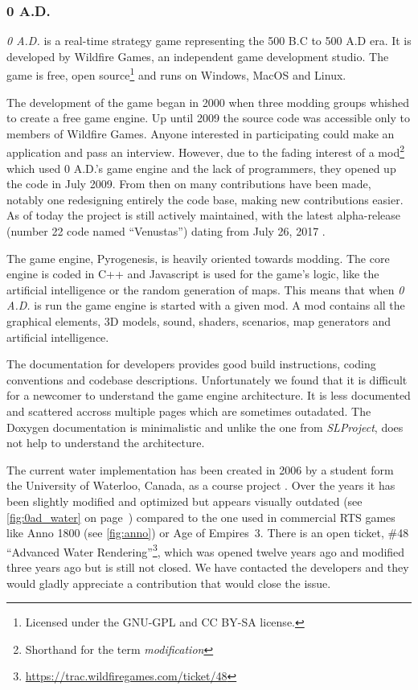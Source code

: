 \subsubsection{0 A.D.}

\textit{0 A.D.} is a real-time strategy game representing the 500 B.C to 500 A.D
era. It is developed by Wildfire Games, an independent game development studio.
The game is free, open source\footnote{Licensed under the GNU-GPL and CC BY-SA
license.} and runs on Windows, MacOS and Linux.

The development of the game began in 2000 when three modding groups whished to
create a free game engine. Up until 2009 the source code was accessible only to
members of Wildfire Games. Anyone interested in participating could make an
application and pass an interview. However, due to the fading interest of a
mod\footnote{Shorthand for the term \textit{modification}} which used 0 A.D.'s
game engine and the lack of programmers, they opened up the code in July 2009.
From then on many contributions have been made, notably one redesigning entirely
the code base, making new contributions easier. As of today the project is still
actively maintained, with the latest alpha-release (number 22 code named
``Venustas'') dating from July 26,
2017 \autocite{wildfire0adproject,wildfire0adstory}.

The game engine, Pyrogenesis, is heavily oriented towards modding. The core
engine is coded in C++ and Javascript is used for the game's logic, like the
artificial intelligence or the random generation of maps. This means that when
\textit{0 A.D.} is run the game engine is started with a given mod. A mod
contains all the graphical elements, 3D models, sound, shaders, scenarios, map
generators and artificial intelligence.

The documentation for developers provides good build instructions, coding
conventions and codebase descriptions. Unfortunately we found that it is
difficult for a newcomer to understand the game engine architecture. It is less
documented and scattered accross multiple pages which are sometimes outadated.
The Doxygen documentation is minimalistic and unlike the one from
\textit{SLProject}, does not help to understand the architecture.

The current water implementation has been created in 2006 by a student form the
University of Waterloo, Canada, as a course project \autocite{zaharia2006cs}.
Over the years it has been slightly modified and optimized but appears visually
outdated (see \autoref{fig:0ad_water} on page~\pageref{fig:0ad_water}) compared
to the one used in commercial RTS games like Anno 1800 (see
\autoref{fig:anno}) or Age of Empires~3. There is an open ticket, \#48
``Advanced Water
Rendering''\footnote{\url{https://trac.wildfiregames.com/ticket/48}}, which was
opened twelve years ago and modified three years ago but is still not closed.
We have contacted the developers and they would gladly appreciate a contribution
that would close the issue.

